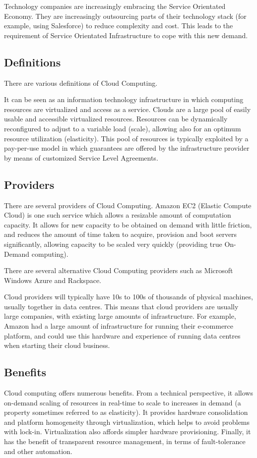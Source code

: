 \documentclass{article}
\begin{document}
Technology companies are increasingly embracing the Service Orientated Economy. They are increasingly outsourcing parts of their technology stack (for example, using Salesforce) to reduce complexity and cost. This leads to the requirement of Service Orientated Infrastructure to cope with this new demand.

\subsection{Definitions}
There are various definitions of Cloud Computing.

It can be seen as an information technology infrastructure in which computing resources are virtualized and access as a service. Clouds are a large pool of easily usable and accessible virtualized resources. Resources can be dynamically reconfigured to adjust to a variable load (scale), allowing also for an optimum resource utilization (elasticity). This pool of resources is typically exploited by a pay-per-use model in which guarantees are offered by the infrastructure provider by means of customized Service Level Agreements.

\subsection{Providers}
There are several providers of Cloud Computing. Amazon EC2 (Elastic Compute Cloud) is one such service which allows a resizable amount of computation capacity. It allows for new capacity to be obtained on demand with little friction, and reduces the amount of time taken to acquire, provision and boot servers significantly, allowing capacity to be scaled very quickly (providing true On-Demand computing). 

There are several alternative Cloud Computing providers such as Microsoft Windows Azure and Rackspace. 

Cloud providers will typically have 10s to 100s of thousands of physical machines, usually together in data centres. This means that cloud providers are usually large companies, with existing large amounts of infrastructure. For example, Amazon had a large amount of infrastructure for running their e-commerce platform, and could use this hardware and experience of running data centres when starting their cloud business.

\subsection{Benefits}
Cloud computing offers numerous benefits. From a technical perspective, it allows on-demand scaling of resources in real-time to scale to increases in demand (a property sometimes referred to as elasticity). It provides hardware consolidation and platform homogeneity through virtualization, which helps to avoid problems with lock-in. Virtualization also affords simpler hardware provisioning. Finally, it has the benefit of transparent resource management, in terms of fault-tolerance and other automation.
\end{document}
